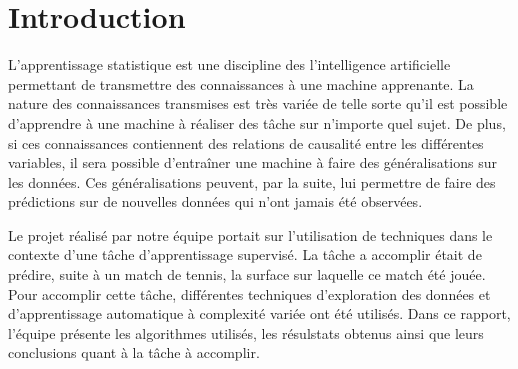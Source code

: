 \section{Introduction}

L'apprentissage statistique est une discipline des l'intelligence artificielle permettant de transmettre des connaissances à une machine apprenante. La nature des connaissances transmises est très variée de telle sorte qu'il est possible d'apprendre à une machine à réaliser des tâche sur n'importe quel sujet. De plus, si ces connaissances contiennent des relations de causalité entre les différentes variables, il sera possible d'entraîner une machine à faire des généralisations sur les données. Ces généralisations peuvent, par la suite, lui permettre de faire des prédictions sur de nouvelles données qui n'ont jamais été observées.

Le projet réalisé par notre équipe portait sur l'utilisation de techniques dans le contexte d'une tâche d'apprentissage supervisé. La tâche a accomplir était de prédire, suite à un match de tennis, la surface sur laquelle ce match été jouée.  Pour accomplir cette tâche, différentes techniques d'exploration des données et d'apprentissage automatique à complexité variée ont été utilisés.  Dans ce rapport, l'équipe présente les algorithmes utilisés, les résulstats obtenus ainsi que leurs conclusions quant à la tâche à accomplir.

